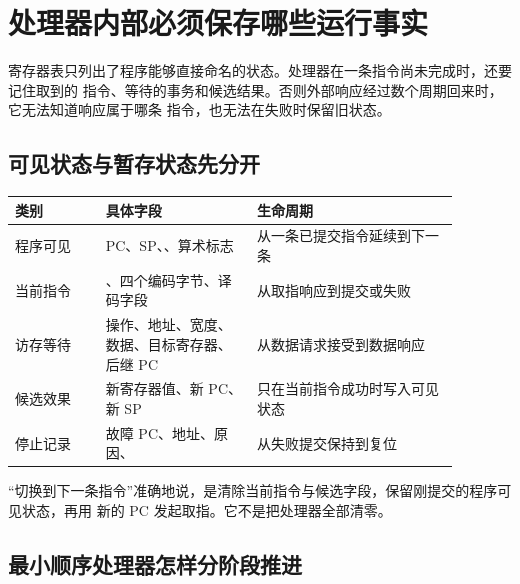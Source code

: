 \section{处理器内部必须保存哪些运行事实}

寄存器表只列出了程序能够直接命名的状态。处理器在一条指令尚未完成时，还要记住取到的
指令、等待的事务和候选结果。否则外部响应经过数个周期回来时，它无法知道响应属于哪条
指令，也无法在失败时保留旧状态。

\subsection{可见状态与暂存状态先分开}

\begin{longtable}{|L{0.18\linewidth}|L{0.30\linewidth}|L{0.40\linewidth}|}
\hline
{}
类别 & 具体字段 & 生命周期 \\ \hline
程序可见 & PC、SP、、算术标志 & 从一条已提交指令延续到下一条 \\ \hline
当前指令 & 、四个编码字节、译码字段 & 从取指响应到提交或失败 \\ \hline
访存等待 & 操作、地址、宽度、数据、目标寄存器、后继 PC & 从数据请求接受到数据响应 \\ \hline
候选效果 & 新寄存器值、新 PC、新 SP & 只在当前指令成功时写入可见状态 \\ \hline
停止记录 & 故障 PC、地址、原因、 & 从失败提交保持到复位 \\ \hline
\end{longtable}

“切换到下一条指令”准确地说，是清除当前指令与候选字段，保留刚提交的程序可见状态，再用
新的 PC 发起取指。它不是把处理器全部清零。

\subsection{最小顺序处理器怎样分阶段推进}

